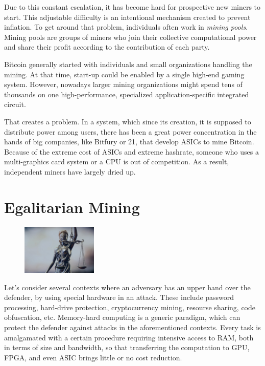 Due to this constant escalation, it has become hard for prospective new miners to start. This adjustable difficulty is an intentional mechanism created to prevent inflation. To get around that problem, individuals often work in \emph{mining pools}. Mining pools are groups of miners who join their collective computational power and share their profit according to the contribution of each party.

Bitcoin generally started with individuals and small organizations handling the mining. At that time, start-up could be enabled by a single high-end gaming system. However, nowadays larger mining organizations might spend tens of thousands on one high-performance, specialized application-specific integrated circuit.

That creates a problem. In a system, which since its creation, it is supposed to distribute power among users, there has been a great power concentration in the hands of big companies, like Bitfury or 21, that develop ASICs to mine Bitcoin. Because of the extreme cost of ASICs and extreme hashrate, someone who uses a multi-graphics card system or a CPU is out of competition. As a result, independent miners have largely dried up.

\section{Egalitarian Mining} \label{sec:egalitarian}
\setlength{\intextsep}{0pt}
\begin{figure}
\centering
\includegraphics[width=0.32\textwidth]{Images/Mining/justice.jpg}
\end{figure}
Let's consider several contexts where an adversary has an upper hand over the defender, by using special hardware in an attack. These include password processing, hard-drive protection, cryptocurrency mining, resourse sharing, code obfuscation, etc. Memory-hard computing is a generic paradigm, which can protect the defender against attacks in the aforementioned contexts. Every task is amalgamated with a certain procedure requiring intensive access to RAM, both in terms of size and bandwidth, so that transferring the computation to GPU, FPGA, and even ASIC brings little or no cost reduction.

